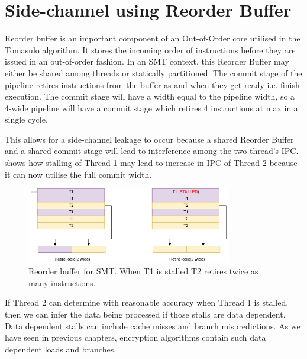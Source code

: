 \chapter{Side-channel using Reorder Buffer}


Reorder buffer is an important component of an Out-of-Order core utilised in the
Tomasulo algorithm. It stores the incoming order of instructions before they
are issued in an out-of-order fashion. In an SMT context, this Reorder Buffer
may either be shared among threads or statically partitioned. The commit
stage of the pipeline retires instructions from the buffer as and when they get
ready i.e. finish execution. The commit stage will have a width equal
to the pipeline width, so a 4-wide pipeline will have a commit stage which
retires 4 instructions at max in a single cycle.

This allows for a side-channel leakage to occur because a shared Reorder Buffer
and a shared commit stage will lead to interference among the two thread's IPC.
 shows how stalling of Thread 1 may lead to increase in IPC of Thread 2 because it can now utilise the full commit width.

\begin{figure}
    \centering
    \includegraphics[width=0.8\textwidth]{figures/rob_side_channel}
    \caption{Reorder buffer for SMT. When T1 is stalled T2 retires twice as
    many instructions.}
    \label{rob_attack}
\end{figure}

If Thread 2 can determine with reasonable accuracy when Thread 1 is stalled,
then we can infer the data being processed if those stalls are data dependent.
Data dependent stalls can include cache misses and branch mispredictions.
As we have seen in previous chapters, encryption algorithms contain such
data dependent loads and branches.
